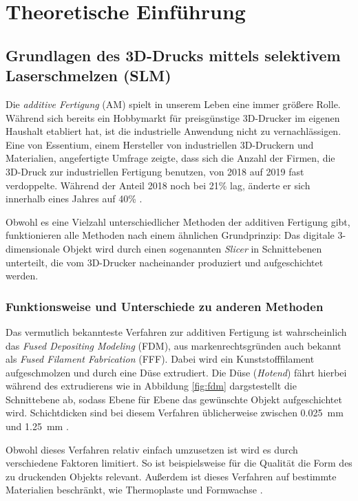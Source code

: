 \chapter{Theoretische Einführung}



\section{Grundlagen des 3D-Drucks mittels selektivem Laserschmelzen (SLM)}
	Die \emph{additive Fertigung} (AM) spielt in unserem Leben eine immer größere Rolle. Während
	sich bereits ein Hobbymarkt für preisgünstige 3D-Drucker im eigenen Haushalt etabliert hat, ist
	die industrielle Anwendung nicht zu vernachlässigen. Eine von Essentium, einem Hersteller von
	industriellen 3D-Druckern und Materialien, angefertigte Umfrage zeigte, dass sich die Anzahl der
	Firmen, die 3D-Druck zur industriellen Fertigung benutzen, von 2018 auf 2019 fast verdoppelte.
	Während der Anteil 2018 noch bei 21\% lag, änderte er sich innerhalb eines Jahres auf 40\%
	\cite{stevenson2019survey}.

	Obwohl es eine Vielzahl unterschiedlicher Methoden der additiven Fertigung gibt, funktionieren
	alle Methoden nach einem ähnlichen Grundprinzip: Das digitale 3-dimension\-ale Objekt wird durch
	einen sogenannten \emph{Slicer} in Schnittebenen unterteilt, die vom 3D-Drucker nacheinander
	produziert und aufgeschichtet werden.

	\subsection{Funktionsweise und Unterschiede zu anderen Methoden}
		Das vermutlich bekannteste Verfahren zur additiven Fertigung ist wahrscheinlich das
		\emph{Fused Depositing Modeling} (FDM), aus markenrechtsgründen auch bekannt als
		\emph{Fused Filament Fabrication} (FFF). Dabei wird ein Kunststofffilament aufgeschmolzen
		und durch eine Düse extrudiert. Die Düse (\emph{Hotend}) fährt hierbei während des
		extrudierens wie in Abbildung \ref{fig:fdm} dargstestellt die Schnittebene ab, sodass Ebene
		für Ebene das gewünschte Objekt aufgeschichtet wird. Schichtdicken sind bei diesem Verfahren
		üblicherweise zwischen \SI{0,025}{\milli\meter} und \SI{1,25}{\milli\meter}
		\cite{wikipedia2021fused}.

		Obwohl dieses Verfahren relativ einfach umzusetzen ist wird es durch verschiedene Faktoren
		limitiert. So ist beispielsweise für die Qualität die Form des zu druckenden Objekts relevant.
		Außerdem ist dieses Verfahren auf bestimmte Materialien beschränkt, wie Thermoplaste und
		Formwachse \cite{wikipedia2021fused}.

